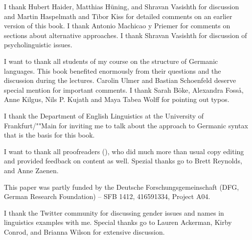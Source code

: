 \addchap{\lsAcknowledgementTitle} 

I thank Hubert Haider, Matthias Hüning, and Shravan Vasishth for discussion and Martin Haspelmath and Tibor Kiss for detailed comments
on an earlier version of this book. I thank Antonio Machicao y Priemer for comments on sections
about alternative approaches. I thank Shravan Vasishth for discussion of psycholinguistic issues.

I want to thank all students of my course on the structure of Germanic languages. This book
benefited enormously from their questions and the discussion during the lectures. 
Carolin Ulmer %
and
Bastian Schoenfeld %
deserve special mention for important comments. I thank 
Sarah Böke,
Alexandra Fosså,
Anne Kilgus,
Nils P. Kujath
and 
Maya Tabea Wolff  
for pointing out typos.

I thank the Department of English Linguistics at the University of Frankfurt/""Main for inviting me to
talk about the approach to Germanic syntax that is the basis for this book.

I want to thank all proofreaders (\makeatletter\@proofreader\makeatother), who did much more than
usual copy editing and provided feedback on 
content as well.  Spezial thanks go to Brett Reynolds, and Anne Zaenen.

This paper was partly funded by the Deutsche Forschungsgemeinschaft (DFG, German Research Foundation) – SFB 1412, 416591334, Project A04.

I thank the Twitter community for discussing gender issues and names in linguistics examples with
me. Special thanks go to Lauren Ackerman, Kirby Conrod, and Brianna Wilson for extensive discussion.





